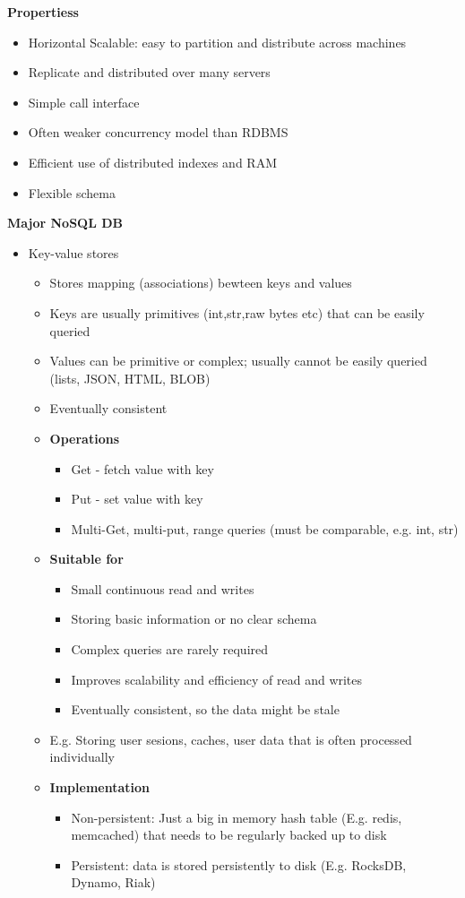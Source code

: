 \documentclass[10pt, landscape]{article}
\begin{document}
\begin{multicols}{4}
\textbf{Propertiess}
\begin{itemize}
  \item Horizontal Scalable: easy to partition and distribute across machines 
  \item Replicate and distributed over many servers 
  \item Simple call interface 
  \item Often weaker concurrency model than RDBMS 
  \item Efficient use of distributed indexes and RAM 
  \item Flexible schema
\end{itemize}


\textbf{Major NoSQL DB}
\begin{itemize}
  \item Key-value stores
  \begin{itemize}
    \item Stores mapping (associations) bewteen keys and values 
    \item Keys are usually primitives (int,str,raw bytes etc) that can be easily queried 
    \item Values can be primitive or complex; usually cannot be easily queried (lists, JSON, HTML, BLOB)
    \item Eventually consistent
    \item \textbf{Operations}
    \begin{itemize}
      \item Get - fetch value with key 
      \item Put - set value with key 
      \item Multi-Get, multi-put, range queries (must be comparable, e.g. int, str)
    \end{itemize}
    \item \textbf{Suitable for}
    \begin{itemize}
      \item Small continuous read and writes
      \item Storing basic information or no clear schema
      \item Complex queries are rarely required
      \item Improves scalability and efficiency of read and writes 
      \item Eventually consistent, so the data might be stale 
    \end{itemize}
    \item E.g. Storing user sesions, caches, user data that is often processed individually
    \item \textbf{Implementation}
    \begin{itemize}
      \item Non-persistent: Just a big in memory hash table (E.g. redis, memcached) that needs to be regularly backed up to disk
      \item Persistent: data is stored persistently to disk (E.g. RocksDB, Dynamo, Riak)
    \end{itemize}
  \end{itemize}


\end{itemize}
\end{multicols}
\end{document}
